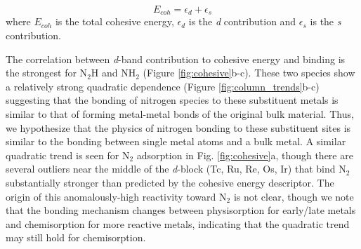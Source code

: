 \begin{equation}
    E_{coh} = \epsilon_d + \epsilon_s
    \label{eq:cohesive}
\end{equation}
where $E_{coh}$ is the total cohesive energy, $\epsilon_d$ is the \textit{d} contribution and $\epsilon_s$ is the \textit{s} contribution.


The correlation between \textit{d}-band contribution to cohesive energy and binding is the strongest for N$_2$H and NH$_2$ (Figure \ref{fig:cohesive}b-c). These two species show a relatively strong quadratic dependence (Figure \ref{fig:column_trends}b-c) suggesting that the bonding of nitrogen species to these substituent metals is similar to that of forming metal-metal bonds of the original bulk material. Thus, we hypothesize that the physics of nitrogen bonding to these substituent sites is similar to the bonding between single metal atoms and a bulk metal.
A similar quadratic trend is seen for N$_2$ adsorption in Fig. \ref{fig:cohesive}a, though there are several outliers near the middle of the \textit{d}-block (Tc, Ru, Re, Os, Ir) that bind N$_2$ substantially stronger than predicted by the cohesive energy descriptor. The origin of this anomalously-high reactivity toward N$_2$ is not clear, though we note that the bonding mechanism changes between physisorption for early/late metals and chemisorption for more reactive metals, indicating that the quadratic trend may still hold for chemisorption.

